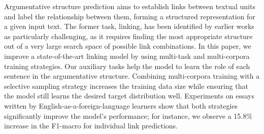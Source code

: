 Argumentative structure prediction aims to establish links between textual units and label the relationship between them, forming a structured representation for a given input text. The former task, linking, has been identified by earlier works as particularly challenging, as it requires finding the most appropriate structure out of a very large search space of possible link combinations. In this paper, we improve a state-of-the-art linking model by using multi-task and multi-corpora training strategies. Our auxiliary tasks help the model to learn the role of each sentence in the argumentative structure. Combining multi-corpora training with a selective sampling strategy increases the training data size while ensuring that the model still learns the desired target distribution well. Experiments on essays written by English-as-a-foreign-language learners show that both strategies significantly improve the model's performance; for instance, we observe a 15.8\% increase in the F1-macro for individual link predictions.
